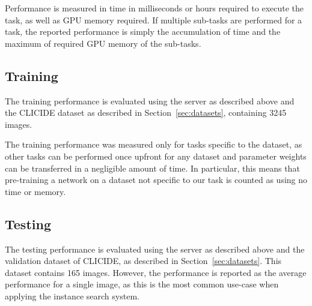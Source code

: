 Performance is measured in time in milliseconds or hours required to
execute the task, as well as GPU memory required.
If multiple sub-tasks are performed for
a task, the reported performance is simply the accumulation of time and
the maximum of required GPU memory of the sub-tasks.
\subsection{Training}
The training performance is evaluated using the server as described above
and the CLICIDE dataset as described in Section~\ref{sec:datasets},
containing 3245 images.

The training performance was measured only for tasks specific to the dataset,
as other tasks can be performed once upfront for any dataset and parameter
weights can be transferred in a negligible amount of time.
In particular, this means
that pre-training a network on a dataset not specific to our task is
counted as using no time or memory.

\subsection{Testing}
The testing performance is evaluated using the server as described above and
the validation dataset of CLICIDE, as described in Section~\ref{sec:datasets}.
This dataset contains 165 images. However, the performance is reported
as the average performance for a single image, as this is the most common
use-case when applying the instance search system.
